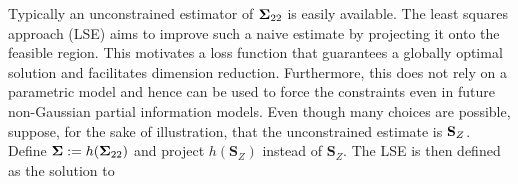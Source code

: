 \documentclass[11pt]{article}
\newcommand{\COR}{\text{COR}}
\theoremstyle{definition}
\theoremstyle{definition}
\def\bSigma{{\bf \Sigma}}
\def\M{{\bf M}}
\def\SS{{\bf S}}
\def\Tr{\text{tr}}
\begin{document}
Typically an unconstrained estimator of $\bSigma_{22}$ is easily available. The least squares approach (LSE) aims to improve such a naive estimate by projecting it onto the feasible region. 
This motivates a loss function that guarantees a globally optimal solution and facilitates dimension reduction. Furthermore, this does not rely on a parametric model and hence can be used to force the constraints even in future non-Gaussian partial information models. 
%
%
Even though many choices are possible, suppose, for the sake of illustration, that the unconstrained estimate is $\SS_Z$. 
Define $\bSigma := h(\bSigma_{22})$ and project $h(\boldsymbol{S}_Z)$ instead of $\boldsymbol{S}_Z$. 
The LSE is then defined as the solution to
\end{document}
